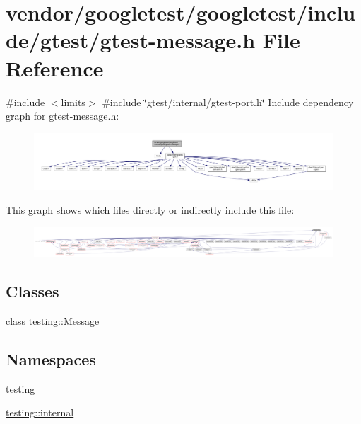 \hypertarget{gtest-message_8h}{}\section{vendor/googletest/googletest/include/gtest/gtest-\/message.h File Reference}
\label{gtest-message_8h}
{\ttfamily \#include $<$limits$>$}\newline
{\ttfamily \#include \char`\"{}gtest/internal/gtest-\/port.\+h\char`\"{}}\newline
Include dependency graph for gtest-\/message.h\+:
\nopagebreak
\begin{figure}[H]
\begin{center}
\leavevmode
\includegraphics[width=350pt]{gtest-message_8h__incl}
\end{center}
\end{figure}
This graph shows which files directly or indirectly include this file\+:
\nopagebreak
\begin{figure}[H]
\begin{center}
\leavevmode
\includegraphics[width=350pt]{gtest-message_8h__dep__incl}
\end{center}
\end{figure}
\subsection*{Classes}
\begin{DoxyCompactItemize}
\item 
class \hyperlink{classtesting_1_1_message}{testing\+::\+Message}
\end{DoxyCompactItemize}
\subsection*{Namespaces}
\begin{DoxyCompactItemize}
\item 
 \hyperlink{namespacetesting}{testing}
\item 
 \hyperlink{namespacetesting_1_1internal}{testing\+::internal}
\end{DoxyCompactItemize}
